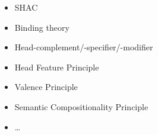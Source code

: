 \documentclass[a4paper,landscape,headrule,footrule,dvips]{foils}
\begin{document}
\begin{itemize}
\item SHAC
\item Binding theory
\item Head-complement/-specifier/-modifier
\item Head Feature Principle
\item Valence Principle
\item Semantic Compositionality Principle
\item \ldots 
\end{itemize}




\end{document}
